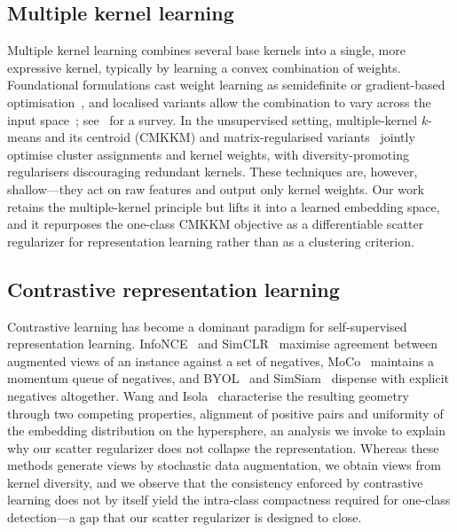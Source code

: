 \documentclass[times, review, 10pt]{elsarticle}
\begin{document}
\subsection{Multiple kernel learning}
\label{subsec:rel-mkl}
Multiple kernel learning combines several base kernels into a single, more
expressive kernel, typically by learning a convex combination of weights.
Foundational formulations cast weight learning as semidefinite or
gradient-based optimisation~\cite{lanckriet2004sdp,rakotomamonjy2008simplemkl},
and localised variants allow the combination to vary across the input
space~\cite{gonen2008localized}; see~\cite{gonen2011mkl} for a survey. In the
unsupervised setting, multiple-kernel $k$-means and its centroid (CMKKM) and
matrix-regularised variants~\cite{liu2016mkkm,huang2012mkkm} jointly optimise
cluster assignments and kernel weights, with diversity-promoting regularisers
discouraging redundant kernels. These techniques are, however, shallow---they act
on raw features and output only kernel weights. Our work retains the
multiple-kernel principle but lifts it into a learned embedding space, and it
repurposes the one-class CMKKM objective as a differentiable scatter
regularizer for representation learning rather than as a clustering criterion.

\subsection{Contrastive representation learning}
\label{subsec:rel-cl}
Contrastive learning has become a dominant paradigm for self-supervised
representation learning. InfoNCE~\cite{oord2018infonce} and
SimCLR~\cite{chen2020simclr} maximise agreement between augmented views of an
instance against a set of negatives, MoCo~\cite{he2020moco} maintains a momentum
queue of negatives, and BYOL~\cite{grill2020byol} and
SimSiam~\cite{chen2021simsiam} dispense with explicit negatives altogether. Wang
and Isola~\cite{wang2020uniformity} characterise the resulting geometry through
two competing properties, {alignment} of positive pairs and
{uniformity} of the embedding distribution on the hypersphere, an analysis
we invoke to explain why our scatter regularizer does not collapse the
representation. Whereas these methods generate views by stochastic data
augmentation, we obtain views from kernel diversity, and we observe that the
consistency enforced by contrastive learning does not by itself yield the
intra-class compactness required for one-class detection---a gap that our scatter
regularizer is designed to close.
\end{document}
